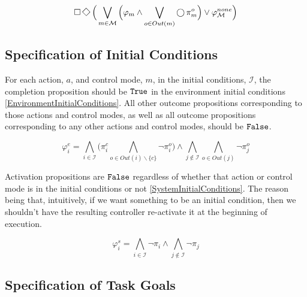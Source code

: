 \begin{equation}\label{TopologyFairnessConditionsFormula}
	\LTLG \LTLF \Big( \bigvee \limits_{m \in \mathcal{M}} \Big( \varphi_m \wedge \bigvee \limits_{o \in Out(m)} \LTLX \pi_m^o \Big) \vee \varphi_\mathcal{M}^{none} \Big)
\end{equation}


\subsection{Specification of Initial Conditions}

For each action, $a$, and control mode, $m$, in the initial conditions, $\mathcal{I}$, the completion proposition should be $\mathtt{True}$ in the environment initial conditions \eqref{EnvironmentInitialConditions}.
All other outcome propositions corresponding to those actions and control modes, as well as all outcome propositions corresponding to any other actions and control modes, should be $\mathtt{False}$.

\begin{equation}\label{EnvironmentInitialConditions}
	\varphi_i^e = \bigwedge \limits_{i \in \mathcal{I}} \Big( \pi_i^c \bigwedge \limits_{o \in Out(i)\backslash \{c\}} \lnot \pi_i^o \Big) \wedge \bigwedge \limits_{j \not\in \mathcal{I}} \bigwedge \limits_{o \in Out(j)} \lnot \pi_j^o
\end{equation}

Activation propositions are $\mathtt{False}$ regardless of whether that action or control mode is in the initial conditions or not \eqref{SystemInitialConditions}.
The reason being that, intuitively, if we want something to be an initial condition, then we shouldn't have the resulting controller re-activate it at the beginning of execution.

\begin{equation}\label{SystemInitialConditions}
	\varphi_i^s = \bigwedge \limits_{i \in \mathcal{I}} \lnot \pi_i \wedge \bigwedge \limits_{j \not \in \mathcal{I}} \lnot \pi_j
\end{equation}



\subsection{Specification of Task Goals}

